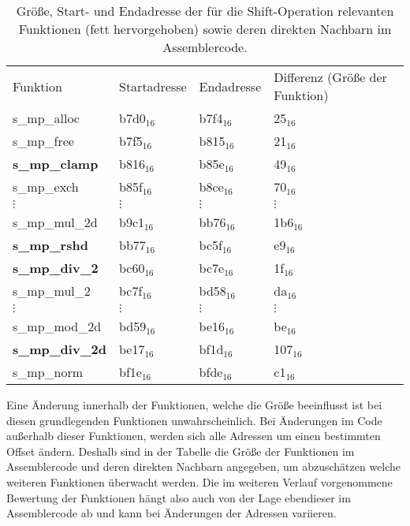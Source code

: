 \begin{table}[h]
\label{tbl:assOffsetShift}
\caption{Größe, Start- und Endadresse der für die Shift-Operation relevanten Funktionen (fett hervorgehoben) sowie deren direkten Nachbarn im Assemblercode.}
\begin{tabular}{llll}
Funktion       & Startadresse & Endadresse & Differenz (Größe der Funktion) \\[10pt]
s\_mp\_alloc   & b7d0$_{16}$        & b7f4$_{16}$      & 25$_{16}$   \\
s\_mp\_free    & b7f5$_{16}$        & b815$_{16}$      & 21$_{16}$   \\
\textbf{s\_mp\_clamp}   & b816$_{16}$        & b85e$_{16}$      & 49$_{16}$   \\
s\_mp\_exch    & b85f$_{16}$        & b8ce$_{16}$      & 70$_{16}$   \\
$\vdots$               &  $\vdots$             &    $\vdots$         &     $\vdots$   \\
s\_mp\_mul\_2d & b9c1$_{16}$        & bb76$_{16}$      & 1b6$_{16}$   \\
\textbf{s\_mp\_rshd}    & bb77$_{16}$        & bc5f$_{16}$      & e9$_{16}$   \\
\textbf{s\_mp\_div\_2}  & bc60$_{16}$        & bc7e$_{16}$      & 1f$_{16}$   \\
s\_mp\_mul\_2  & bc7f$_{16}$        & bd58$_{16}$      & da$_{16}$   \\
$\vdots$               &  $\vdots$             &    $\vdots$         &     $\vdots$   \\
s\_mp\_mod\_2d & bd59$_{16}$        & be16$_{16}$      & be$_{16}$   \\
\textbf{s\_mp\_div\_2d} & be17$_{16}$        & bf1d$_{16}$      & 107$_{16}$  \\
s\_mp\_norm    & bf1e$_{16}$        & bfde$_{16}$      & c1$_{16}$  
\end{tabular}
\end{table}

Eine Änderung innerhalb der Funktionen, welche die Größe beeinflusst ist bei diesen grundlegenden Funktionen unwahrscheinlich.
Bei Änderungen im Code außerhalb dieser Funktionen, werden sich alle Adressen um einen bestimmten Offset ändern.
Deshalb sind in der Tabelle die Größe der Funktionen im Assemblercode und deren direkten Nachbarn angegeben, um abzuschätzen welche weiteren Funktionen überwacht werden.
Die im weiteren Verlauf vorgenommene Bewertung der Funktionen hängt also auch von der Lage ebendieser im Assemblercode ab und kann bei Änderungen der Adressen variieren.

